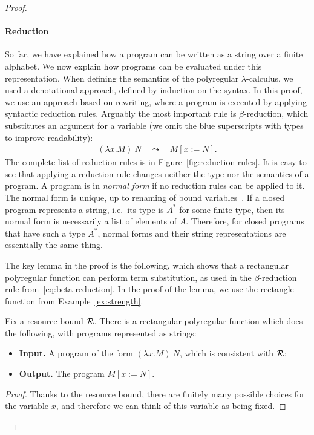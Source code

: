 \begin{proof}
        \paragraph*{Reduction} So far, we have explained how a program can be written as a string over a finite alphabet. We now explain how programs can be evaluated under this representation. 
    When defining the semantics of the polyregular $\lambda$-calculus, we used a denotational approach, defined by  induction on the syntax. In this proof, we use an approach based on rewriting, where  a program is executed by applying syntactic reduction rules. Arguably the most important rule is $\beta$-reduction, which  substitutes an argument for a variable (we omit the blue superscripts with types to improve readability): 
    \begin{align}\label{eq:beta-reduction}
    (\lambda x. M)\ N \quad \leadsto \quad M[x:=N].
    \end{align}
The complete list of reduction rules is in Figure~\ref{fig:reduction-rules}.
It is easy to see that applying a reduction rule changes neither the type nor the semantics of a program.  A program is in \emph{normal form} if no reduction rules can be applied to it. The normal form is unique, up to renaming of bound variables~\cite[Corollary 1.4.9]{sorensenLecturesCurryHowardIsomorphism2006}. If a closed program represents a string, i.e.~its type is $A^*$ for some finite type, then its normal form is necessarily a list of elements of $A$. Therefore, for closed programs that have such a type $A^*$, normal forms and their string representations are essentially the same thing.


    The key lemma in the proof is the following, which shows that a rectangular polyregular function can perform term  substitution, as used in the $\beta$-reduction rule from~\eqref{eq:beta-reduction}. In the proof of the lemma, we use the rectangle function from Example~\ref{ex:strength}. 
    \begin{lemma}\label{lem:substitution}
        Fix a resource bound ${\mathcal R}$. There is a rectangular polyregular function which does the following, with programs represented as strings:
        \begin{itemize}
            \item \textbf{Input.} A program of the form $(\lambda x. M) \ N$, which is consistent with ${\mathcal R}$; 
            \item \textbf{Output.} The program $M[x:=N]$.
        \end{itemize}
    \end{lemma}
    \begin{proof}Thanks to the resource bound, there are finitely many possible choices for the variable $x$, and therefore we can think of this variable as being fixed. 


\end{proof}
\end{proof}
